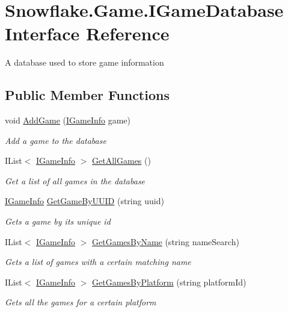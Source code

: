 \hypertarget{interface_snowflake_1_1_game_1_1_i_game_database}{}\section{Snowflake.\+Game.\+I\+Game\+Database Interface Reference}
\label{interface_snowflake_1_1_game_1_1_i_game_database}


A database used to store game information  


\subsection*{Public Member Functions}
\begin{DoxyCompactItemize}
\item 
void \hyperlink{interface_snowflake_1_1_game_1_1_i_game_database_ac3df9a6fa7133f65296dfc500d545083}{Add\+Game} (\hyperlink{interface_snowflake_1_1_game_1_1_i_game_info}{I\+Game\+Info} game)
\begin{DoxyCompactList}\small\item\em Add a game to the database \end{DoxyCompactList}\item 
I\+List$<$ \hyperlink{interface_snowflake_1_1_game_1_1_i_game_info}{I\+Game\+Info} $>$ \hyperlink{interface_snowflake_1_1_game_1_1_i_game_database_a3584894d7c51710b8f0798ea2c37627e}{Get\+All\+Games} ()
\begin{DoxyCompactList}\small\item\em Get a list of all games in the database \end{DoxyCompactList}\item 
\hyperlink{interface_snowflake_1_1_game_1_1_i_game_info}{I\+Game\+Info} \hyperlink{interface_snowflake_1_1_game_1_1_i_game_database_aef05226f448d26158878e2b3e9174600}{Get\+Game\+By\+U\+U\+I\+D} (string uuid)
\begin{DoxyCompactList}\small\item\em Gets a game by it\textquotesingle{}s unique id \end{DoxyCompactList}\item 
I\+List$<$ \hyperlink{interface_snowflake_1_1_game_1_1_i_game_info}{I\+Game\+Info} $>$ \hyperlink{interface_snowflake_1_1_game_1_1_i_game_database_a020cfc0c7185c730e072bb2488871c6f}{Get\+Games\+By\+Name} (string name\+Search)
\begin{DoxyCompactList}\small\item\em Gets a list of games with a certain matching name \end{DoxyCompactList}\item 
I\+List$<$ \hyperlink{interface_snowflake_1_1_game_1_1_i_game_info}{I\+Game\+Info} $>$ \hyperlink{interface_snowflake_1_1_game_1_1_i_game_database_a8be96dda13fe81e23d35dbb0e50a36e0}{Get\+Games\+By\+Platform} (string platform\+Id)
\begin{DoxyCompactList}\small\item\em Gets all the games for a certain platform \end{DoxyCompactList}\end{DoxyCompactItemize}


